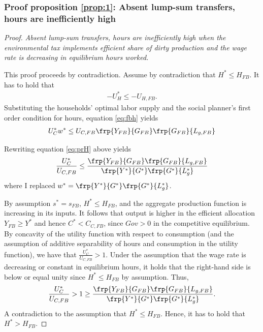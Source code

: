 \subsubsection{Proof proposition \ref{prop:1}: Absent lump-sum transfers, hours are inefficiently high}
\begin{proof}\textit{Absent lump-sum transfers, hours are inefficiently high when the environmental tax implements efficient share of dirty production and the wage rate is decreasing in equilibrium hours worked.}
	
	This proof proceeds by contradiction. 
	Assume by contradiction that $H^*\leq H_{FB}$. 
	It has to hold that 
	\begin{align}
	-U_H^*\leq -U_{H,FB}.
	\end{align} 
	Substituting the households' optimal labor supply and the social planner's first order condition for hours, equation \ref{eq:fbh} yields
	\begin{align}\label{eq:prH}
	U_C^*w^* \leq U_{C,FB}\frp{Y_{FB}}{G_{FB}}\frp{G_{FB}}{L_{g,FB}}
	\end{align}
	
	Rewriting equation \ref{eq:prH} above yields
	\begin{align}
	\frac{U_C^*}{U_{C,FB}}\leq \frac{\frp{Y_{FB}}{G_{FB}}\frp{G_{FB}}{L_{g,FB}}}{\frp{Y^*}{G^*}\frp{G^*}{L^*_{g}}}
	\end{align}
	where I replaced $w^*=\frp{Y^*}{G^*}\frp{G^*}{L^*_{g}}$.
	
	By assumption $s^*=s_{FB}$, $H^*\leq H_{FB}$, and the aggregate production function is increasing in its inputs. It follows that output is higher in the efficient allocation $Y_{FB}\geq Y^*$ and hence $C^*<C_{C,FB}$, since $Gov>0$ in the competitive equilibrium. By concavity of the utility function with respect to consumption (and the assumption of additive separability of hours and consumption in the utility function), we have that $\frac{U_C^*}{U_{C,FB}}>1$.
	Under the assumption that the wage rate is decreasing or constant in equilibrium hours, it holds that the right-hand side is below or equal unity since $H^*\leq H_{FB}$ by assumption. Thus,
	\begin{align}
	\frac{U_C^*}{U_{C,FB}}>1\geq \frac{\frp{Y_{FB}}{G_{FB}}\frp{G_{FB}}{L_{g,FB}}}{\frp{Y^*}{G^*}\frp{G^*}{L^*_{g}}}. 
	\end{align}
	A contradiction to the assumption that $H^*\leq H_{FB}$. Hence, it has to hold that $H^*>H_{FB}$. 
\end{proof}


